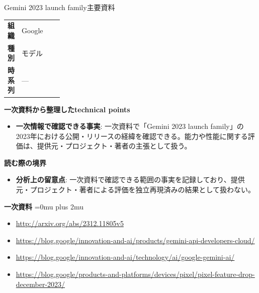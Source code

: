 \begin{technicalnote}{Gemini 2023 launch family}{主要資料}
\begingroup
\begin{tabularx}{\linewidth}{@{}>{\bfseries}p{0.22\linewidth}X@{}}
組織 & Google \\
種別 & モデル \\
時系列 & — \\
\end{tabularx}
\smallskip
{\bfseries 一次資料から整理したtechnical points}
\begin{itemize}[leftmargin=1.5em,itemsep=0.35em]
\item \textbf{一次情報で確認できる事実}: 一次資料で「Gemini 2023 launch family」の2023年における公開・リリースの経緯を確認できる。能力や性能に関する評価は、提供元・プロジェクト・著者の主張として扱う。
\end{itemize}
\begin{minipage}{\linewidth}
{\bfseries 読む際の境界}
\begin{itemize}[leftmargin=1.5em,itemsep=0.35em]
\item \textbf{分析上の留意点}: 一次資料で確認できる範囲の事実を記録しており、提供元・プロジェクト・著者による評価を独立再現済みの結果として扱わない。
\end{itemize}
\begin{samepage}
{\bfseries 一次資料}
\begingroup\sloppy
\Urlmuskip=0mu plus 2mu\relax
\begin{itemize}[leftmargin=1.5em,itemsep=0.25em]
\item {\scriptsize\url{http://arxiv.org/abs/2312.11805v5}}
\item {\scriptsize\url{https://blog.google/innovation-and-ai/products/gemini-api-developers-cloud/}}
\item {\scriptsize\url{https://blog.google/innovation-and-ai/technology/ai/google-gemini-ai/}}
\item {\scriptsize\url{https://blog.google/products-and-platforms/devices/pixel/pixel-feature-drop-december-2023/}}
\end{itemize}
\endgroup
\end{samepage}
\end{minipage}
\endgroup
\end{technicalnote}
\medskip

